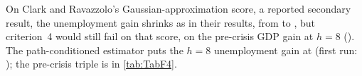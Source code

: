 On Clark and Ravazzolo's Gaussian-approximation score, a reported secondary result, the
unemployment gain shrinks as in their results, from
 to
, but criterion~4 would still fail on
that score, on the pre-crisis GDP gain at $h = 8$
(). The path-conditioned estimator
puts the $h = 8$ unemployment gain at
 (first run: );
the pre-crisis triple is in \cref{tab:TabF4}. %

